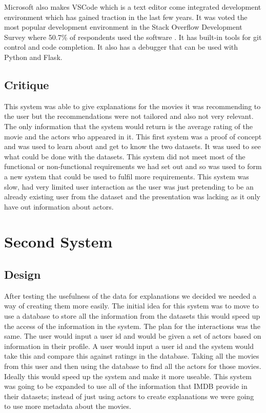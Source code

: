                 Microsoft also makes VSCode which is a text editor come integrated development environment which has gained traction in the last few years. It was voted the most popular development environment in the Stack Overflow Development Survey where 50.7\% of respondents used the software \cite{StackOverflowDevSurvey}. It has built-in tools for git control and code completion. It also has a debugger that can be used with Python and Flask. 


            
        \subsection{Critique}
            This system was able to give explanations for the movies it was recommending to the user but the recommendations were not tailored and also not very relevant. The only information that the system would return is the average rating of the movie and the actors who appeared in it. This first system was a proof of concept and was used to learn about and get to know the two datasets. It was used to see what could be done with the datasets. This system did not meet most of the functional or non-functional requirements we had set out and so was used to form a new system that could be used to fulfil more requirements.
            This system was slow, had very limited user interaction as the user was just pretending to be an already existing user from the dataset and the presentation was lacking as it only have out information about actors.
                

        
    \section{Second System}
        \subsection{Design}
            After testing the usefulness of the data for explanations we decided we needed a way of creating them more easily. The initial idea for this system was to move to use a database to store all the information from the datasets this would speed up the access of the information in the system. The plan for the interactions was the same. The user would input a user id and would be given a set of actors based on information in their profile. A user would input a user id and the system would take this and compare this against ratings in the database. Taking all the movies from this user and then using the database to find all the actors for those movies. Ideally this would speed up the system and make it more useable. This system was going to be expanded to use all of the information that IMDB provide in their datasets; instead of just using actors to create explanations we were going to use more metadata about the movies. 

